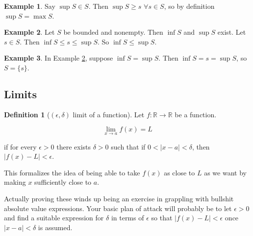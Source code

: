 \documentclass{article}
\theoremstyle{definition}
\newtheorem{definition}{Definition}
\newtheorem{example}{Example}
\begin{document}
\begin{example}
Say $\sup S \in S$. Then $\sup S \ge s$ $\forall s \in S$, so by definition $\sup S = \max S$.
\end{example}

\begin{example} \label{bound-comparison}
Let $S$ be bounded and nonempty. Then $\inf S$ and $\sup S$ exist. Let $s \in S$. Then $\inf S \le s \le \sup S$.
So $\inf S \le \sup S$.
\end{example}

\begin{example}
In Example \ref{bound-comparison}, suppose $\inf S = \sup S$. Then $\inf S = s = \sup S$, so $S = \{s\}$.
\end{example}

\subsection{Limits}


\begin{definition}[$(\epsilon, \delta)$ limit of a function]

Let $f: \mathbb{R} \to \mathbb{R}$ be a function. 

\begin{equation}
\lim_{x \to a} f(x) = L
\end{equation}

if for every $\epsilon > 0$ there exists $\delta > 0$ such that if $0 < |x-a| <
\delta$, then $|f(x) - L| < \epsilon$.
 
\end{definition}

This formalizes the idea of being able to take $f(x)$ as close to $L$ as we want
by making $x$ sufficiently close to $a$.

Actually proving these winds up being an exercise in grappling with bullshit
absolute value expressions. Your basic plan of attack will probably be to let
$\epsilon > 0$ and find a suitable expression for $\delta$ in terms of
$\epsilon$ so that $|f(x) -L| < \epsilon$ once $|x-a|< \delta$ is assumed.
\end{document}
